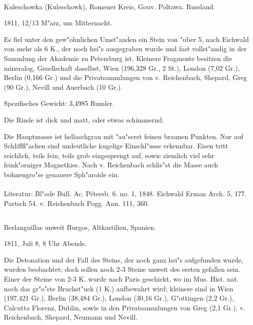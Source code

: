 \documentclass[a4paper, 11pt, oneside]{article}
\begin{document}
\paragraph{}
Kuleschowka (Kuleschowk), Romener Kreis, Gouv. Poltawa. Russland.

1811, 12/13 M"arz, um Mitternacht.

Es fiel unter den gew"ohnlichen Umst"anden ein Stein von "uber 5, nach Eichwald von mehr als 6 K., der noch hei"s ausgegraben wurde und fast vollst"andig in der Sammlung der Akademie zu Petersburg ist. Kleinere Fragmente besitzen die mineralog. Gesellschaft daselbst, Wien (196,328 Gr., 2 St.), London (7,02 Gr.), Berlin (0,166 Gr.) und die Privatsammlungen von v. Reichenbach, Shepard, Greg (90 Gr.), Nevill und Auerbach (10 Gr.).

Spezifisches Gewicht: 3,4985 Rumler.

Die Rinde ist dick und matt, oder etwas schimmernd.

Die Hauptmasse ist hellaschgrau mit "au"serst feinen braunen Punkten. Nur auf Schlifffl"achen sind undeutliche kugelige Einschl"usse erkennbar. Eisen tritt reichlich, teils fein, teils grob eingesprengt auf, sowie ziemlich viel sehr feink"orniger Magnetkies. Nach v. Reichenbach schlie"st die Masse auch bohnengro"se genauere Sph"aroide ein.
\normalsize
\paragraph{}
Literatur: Bl"ode Bull. Ac. Pétersb. 6. no. 1, 1848. Eichwald Erman Arch. 5, 177. Partsch 54. v. Reichenbach Pogg. Ann. 111, 360.
\subsection{}
\LARGE
\paragraph{}
Berlanguillas unweit Burgos, Altkastilien, Spanien.

1811, Juli 8, 8 Uhr Abends.

Die Detonation und der Fall des Steins, der noch ganz hei"s aufgefunden wurde, wurden beobachtet; doch sollen noch 2-3 Steine unweit des ersten gefallen sein. Einer der Steine von 2-3 K. wurde nach Paris geschickt, wo im Mus. Hist. nat. noch das gr"o"ste Bruchst"uck (1 K.) aufbewahrt wird; kleinere sind in Wien (197,421 Gr.), Berlin (38,484 Gr.), London (30,16 Gr.), G"ottingen (2,2 Gr.), Calcutta Florenz, Dublin, sowie in den Privatsammlungen von Greg (2,1 Gr.), v. Reichenbach, Shepard, Neumann und Nevill.
\end{document}
